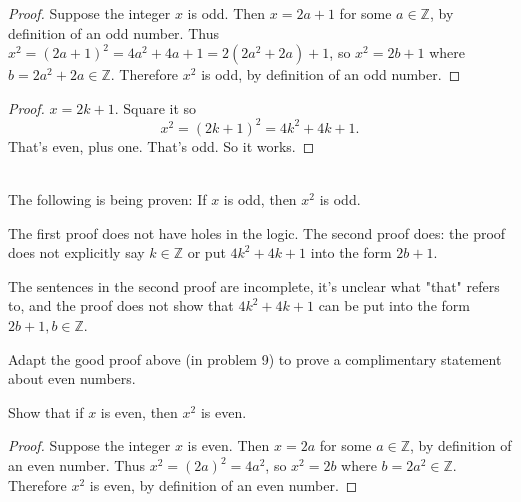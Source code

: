 \documentclass[12 pt]{exam}
\begin{document}
\begin{questions}
\begin{proof} Suppose the integer $x$ is odd. Then $x = 2a+1$ for some $a \in \mathbb{Z}$, by definition
of an odd number. Thus $x^2 = (2a+1)^2 = 4a^2+4a+1 = 2(2a^2+2a)+1$, so
$x^2 = 2b +1$ where $b = 2a^2 +2a \in  \mathbb{Z}$. Therefore $x^2$ is odd, by definition
of an odd number. \end{proof}

\begin{proof} $x = 2k + 1.$
Square it so
\[
x^2 = (2k+1)^2 = 4k^2 + 4k + 1.
\]
That's even, plus one. That's odd. {So it works.}
\end{proof}

\begin{solution} \\
The following is being proven: If $x$ is odd, then $x^2$ is odd.

The first proof does not have holes in the logic. The second proof does: the proof does not explicitly say $k \in \mathbb{Z}$ or put $4k^2 + 4k + 1$ into the form $2b + 1$.

The sentences in the second proof are incomplete, it's unclear what "that" refers to, and the proof does not show that $4k^2 + 4k + 1$ can be put into the form $2b + 1, b \in \mathbb{Z}$.
\end{solution}

\question Adapt the good proof above (in problem 9) to prove a complimentary statement about even numbers.

Show that if $x$ is even, then $x^2$ is even.

\begin{solution}
\begin{proof} Suppose the integer $x$ is even. Then $x = 2a$ for some $a \in \mathbb{Z}$, by definition of an even number. Thus $x^2 = (2a)^2 = 4a^2$, so $x^2 = 2b$ where $b = 2a^2 \in \mathbb{Z}$. Therefore $x^2$ is even, by definition of an even number. \end{proof}
\end{solution}

\end{questions}
\end{document}
